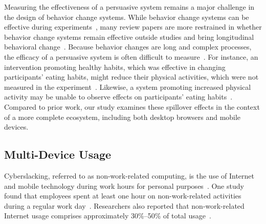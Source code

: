 Measuring the effectiveness of a persuasive system remains a major challenge in the design of behavior change systems. While behavior change systems can be effective during experiments~\cite{doi:10.1080/15228830802094429, Cuijpers2008, info:doi/10.2196/jmir.1376}, many review papers are more restrained in whether behavior change systems remain effective outside studies and bring longitudinal behavioral change~\cite{doi:10.1111/j.1467-789X.2009.00646.x, 10.1371/journal.pmed.1000387, NORMAN2007336, 10.1007/978-3-319-07127-5_11}. Because behavior changes are long and complex processes, the efficacy of a persuasive system is often difficult to measure~\cite{prochaska1997transtheoretical}. For instance, an intervention promoting healthy habits, which was effective in changing participants' eating habits, might reduce their physical activities, which were not measured in the experiment~\cite{COTTER2014243}. Likewise, a system promoting increased physical activity may be unable to observe effects on participants' eating habits~\cite{doi:10.1111/j.1740-9713.2015.00863.x}. Compared to prior work, our study examines these spillover effects in the context of a more complete ecosystem, including both desktop browsers and mobile devices. %

\subsection{Multi-Device Usage}

Cyberslacking, referred to as non-work-related computing, is the use of Internet and mobile technology during work hours for personal purposes~\cite{VITAK20111751,PEE2008120, Pamela2004, lim2002}. One study found that employees spent at least one hour on non-work-related activities during a regular work day~\cite{VITAK20111751}. Researchers also reported that non-work-related Internet usage comprises approximately 30\%--50\% of total usage~\cite{RESTUBOG2011247,JAMALUDDIN2015495}. %


